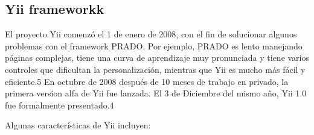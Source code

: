  \newpage

\subsection{Yii frameworkk}

El proyecto Yii comenzó el 1 de enero de 2008, con el fin de solucionar algunos problemas con el framework PRADO. Por ejemplo, PRADO es lento manejando páginas complejas, tiene una curva de aprendizaje muy pronunciada y tiene varios controles que dificultan la personalización, mientras que Yii es mucho más fácil y eficiente.5 En octubre de 2008 después de 10 meses de trabajo en privado, la primera version alfa de Yii fue lanzada. El 3 de Diciembre del mismo año, Yii 1.0 fue formalmente presentado.4

Algunas características de Yii incluyen:

